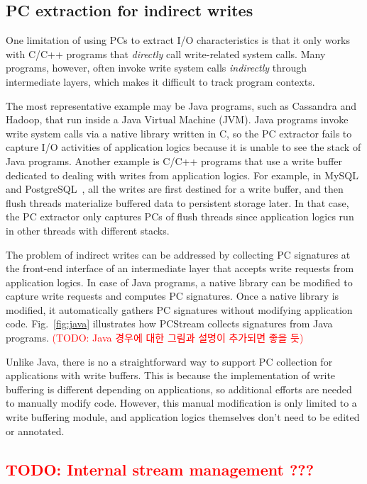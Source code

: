\subsection{PC extraction for indirect writes}
One limitation of using PCs to extract I/O characteristics is that it only
works with C/C++ programs that \textit{directly} call write-related system
calls.  Many programs, however, often invoke write system calls
\textit{indirectly} through intermediate layers, which makes it difficult to
track program contexts.

The most representative example may be Java programs, such as Cassandra and
Hadoop, that run inside a Java Virtual Machine (JVM). Java programs invoke
write system calls via a native library written in C, so the PC extractor fails
to capture I/O activities of application logics because it is unable to see the
stack of Java programs.  Another example is C/C++ programs that use a write
buffer dedicated to dealing with writes from application logics. For example,
in MySQL~\cite{MySQL} and PostgreSQL~\cite{PostgreSQL}, all the writes are first
destined for a write buffer, and then flush threads materialize buffered data
to persistent storage later.  In that case, the PC extractor only captures PCs
of flush threads since application logics run in other threads with different
stacks.

The problem of indirect writes can be addressed by collecting PC signatures at
the front-end interface of an intermediate layer that accepts write requests
from application logics. In case of Java programs, a native library can be
modified to capture write requests and computes PC signatures. Once a native
library is modified, it automatically gathers PC signatures without modifying
application code. Fig.~\ref{fig:java} illustrates how \textsf{PCStream}
collects signatures from Java programs.  \textcolor{red}{(TODO: Java 경우에
대한 그림과 설명이 추가되면 좋을 듯)}

Unlike Java, there is no a straightforward way to support PC collection for
applications with write buffers. This is because the implementation of write
buffering is different depending on applications, so additional efforts are
needed to manually modify code. However, this manual modification is only
limited to a write buffering module, and application logics themselves don't
need to be edited or annotated.



\subsection{\textcolor{red}{TODO: Internal stream management ???}}




